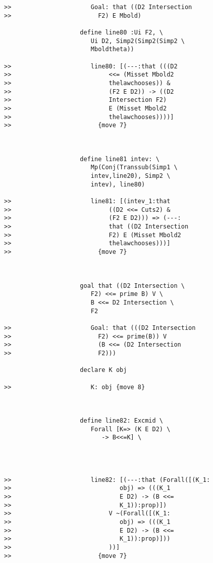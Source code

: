 \documentclass[12pt]{article}
\begin{document}
\begin{verbatim}
>>                      Goal: that ((D2 Intersection
>>                        F2) E Mbold)

                     define line80 :Ui F2, \
                        Ui D2, Simp2(Simp2(Simp2 \
                        Mboldtheta))

>>                      line80: [(---:that (((D2
>>                           <<= (Misset Mbold2
>>                           thelawchooses)) &
>>                           (F2 E D2)) -> ((D2
>>                           Intersection F2)
>>                           E (Misset Mbold2
>>                           thelawchooses))))]
>>                        {move 7}



                     define line81 intev: \
                        Mp(Conj(Transsub(Simp1 \
                        intev,line20), Simp2 \
                        intev), line80)

>>                      line81: [(intev_1:that
>>                           ((D2 <<= Cuts2) &
>>                           (F2 E D2))) => (---:
>>                           that ((D2 Intersection
>>                           F2) E (Misset Mbold2
>>                           thelawchooses)))]
>>                        {move 7}



                     goal that ((D2 Intersection \
                        F2) <<= prime B) V \
                        B <<= D2 Intersection \
                        F2

>>                      Goal: that (((D2 Intersection
>>                        F2) <<= prime(B)) V
>>                        (B <<= (D2 Intersection
>>                        F2)))

                     declare K obj

>>                      K: obj {move 8}



                     define line82: Excmid \
                        Forall [K=> (K E D2) \
                           -> B<<=K] \
                        



>>                      line82: [(---:that (Forall([(K_1:
>>                              obj) => (((K_1
>>                              E D2) -> (B <<=
>>                              K_1)):prop)])
>>                           V ~(Forall([(K_1:
>>                              obj) => (((K_1
>>                              E D2) -> (B <<=
>>                              K_1)):prop)]))
>>                           ))]
>>                        {move 7}




\end{verbatim}
\end{document}

